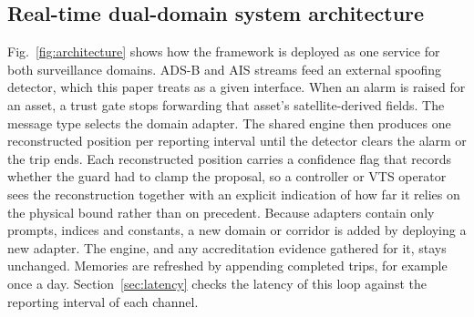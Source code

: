 \subsection{Real-time dual-domain system architecture}
\label{sec:architecture}

Fig.~\ref{fig:architecture} shows how the framework is deployed as one
service for both surveillance domains. ADS-B and AIS streams feed an
external spoofing detector, which this paper treats as a given interface.
When an alarm is raised for an asset, a trust gate stops forwarding that
asset's satellite-derived fields. The message type selects the domain
adapter. The shared engine then produces one reconstructed position per
reporting interval until the detector clears the alarm or the trip ends.
Each reconstructed position carries a confidence flag that records whether
the guard had to clamp the proposal, so a controller or VTS operator sees
the reconstruction together with an explicit indication of how far it
relies on the physical bound rather than on precedent. Because adapters
contain only prompts, indices and constants, a new domain or corridor is
added by deploying a new adapter. The engine, and any accreditation
evidence gathered for it, stays unchanged. Memories are refreshed by
appending completed trips, for example once a day.
Section~\ref{sec:latency} checks the latency of this loop against the
reporting interval of each channel.


